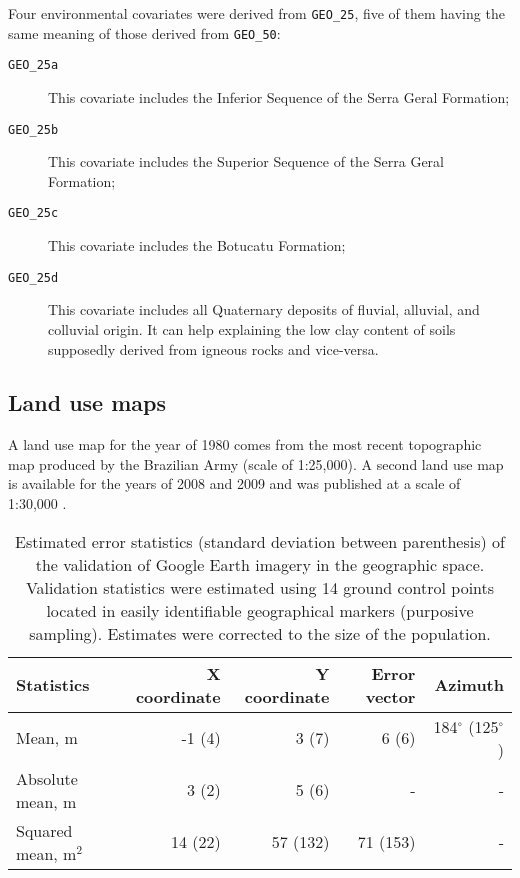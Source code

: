Four environmental covariates were derived from \texttt{GEO\_25}, five of them having the same meaning of those derived from \texttt{GEO\_50}:

\begin{description}
  \item[\texttt{GEO\_25a}] This covariate includes the Inferior Sequence of the Serra Geral Formation;
 
  \item[\texttt{GEO\_25b}] This covariate includes the Superior Sequence of the Serra Geral Formation;
 
  \item[\texttt{GEO\_25c}] This covariate includes the Botucatu Formation;
 
  \item[\texttt{GEO\_25d}] This covariate includes all Quaternary deposits of fluvial, alluvial, and colluvial origin. It can help explaining the low clay content of soils supposedly derived from igneous rocks and vice-versa.
\end{description}

\tocless\subsection{Land use maps}\label{sec:land}

A land use map for the year of 1980 comes from the most recent topographic map produced by the Brazilian Army (scale of 1:25,000). A second land use map is available for the years of 2008 and 2009 and was published at a scale of 1:30,000 \cite{SamuelRosaEtAl2011a}.

\begin{table}[ht]
\caption{Estimated error statistics (standard deviation between parenthesis) of the validation of Google Earth imagery in the geographic space. Validation statistics were estimated using 14 ground control points located in easily identifiable geographical markers (purposive sampling). Estimates were corrected to the size of the population.}
\label{tab:google-geo-val}
\centering
{\small
\begin{tabular}{lrrrr}
\hline
Statistics           & X coordinate & Y coordinate & Error vector  & Azimuth                   \\
\hline
Mean, m              & -1 (4)       & 3  (7)       & 6  (6)        & 184$^\circ$ (125$^\circ$) \\ 
Absolute mean, m     & 3  (2)       & 5  (6)       & -             & -                         \\ 
Squared mean, m$^2$  & 14 (22)      & 57 (132)     & 71 (153)      & -                         \\ 
\hline
\end{tabular}}
\end{table}

